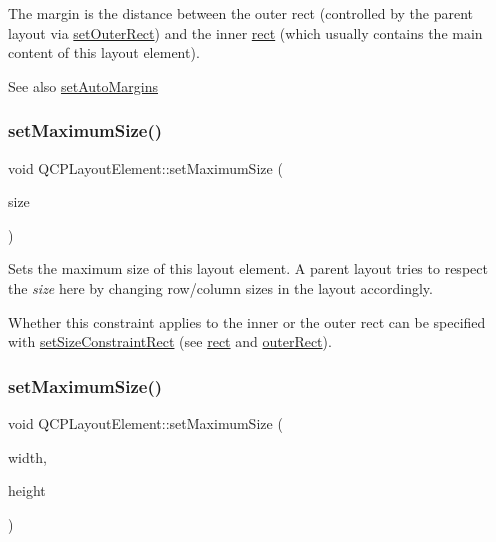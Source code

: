 The margin is the distance between the outer rect (controlled by the parent layout via \mbox{\hyperlink{class_q_c_p_layout_element_a38975ea13e36de8e53391ce41d94bc0f}{set\+Outer\+Rect}}) and the inner \mbox{\hyperlink{class_q_c_p_layout_element_a208effccfe2cca4a0eaf9393e60f2dd4}{rect}} (which usually contains the main content of this layout element).

\begin{DoxySeeAlso}{See also}
\mbox{\hyperlink{class_q_c_p_layout_element_accfda49994e3e6d51ed14504abf9d27d}{set\+Auto\+Margins}} 
\end{DoxySeeAlso}
\mbox{\label{class_q_c_p_layout_element_a74eb5280a737ab44833d506db65efd95}} 
\subsubsection{\texorpdfstring{setMaximumSize()}{setMaximumSize()}\hspace{0.1cm}{\footnotesize\ttfamily [1/2]}}
{\footnotesize\ttfamily void Q\+C\+P\+Layout\+Element\+::set\+Maximum\+Size (\begin{DoxyParamCaption}\item[{const Q\+Size \&}]{size }\end{DoxyParamCaption})}

Sets the maximum size of this layout element. A parent layout tries to respect the {\itshape size} here by changing row/column sizes in the layout accordingly.

Whether this constraint applies to the inner or the outer rect can be specified with \mbox{\hyperlink{class_q_c_p_layout_element_a361666cdcc6fbfd37344cc44be746b0f}{set\+Size\+Constraint\+Rect}} (see \mbox{\hyperlink{class_q_c_p_layout_element_a208effccfe2cca4a0eaf9393e60f2dd4}{rect}} and \mbox{\hyperlink{class_q_c_p_layout_element_a2a32a12a6161c9dffbadeb9cc585510c}{outer\+Rect}}). \mbox{\label{class_q_c_p_layout_element_a03e0e9c48f230217c529b0819f832d84}} 
\subsubsection{\texorpdfstring{setMaximumSize()}{setMaximumSize()}\hspace{0.1cm}{\footnotesize\ttfamily [2/2]}}
{\footnotesize\ttfamily void Q\+C\+P\+Layout\+Element\+::set\+Maximum\+Size (\begin{DoxyParamCaption}\item[{int}]{width,  }\item[{int}]{height }\end{DoxyParamCaption})}

